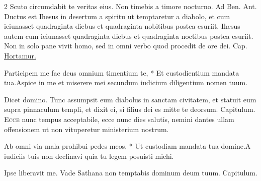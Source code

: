 \begin{multicols*}{2}
\newline \V Scuto circumdabit te veritas eius. \R Non timebis a timore nocturno. {\color{Red} Ad Ben. Ant.} Ductus est Ihesus in desertum a spiritu ut temptaretur a diabolo, et cum ieiunasset quadraginta diebus et quadraginta nobitibus postea esuriit.
 Ihesus autem cum ieiunasset quadraginta diebus et quadraginta noctibus postea esuriit.
 Non in solo pane vivit homo, sed in omni verbo quod procedit de ore dei. {\color{Red} Cap.} \hyperlink{hortamur-vos}{Hortamur.}
\begin{responsory-breve}[participem-me]
{Participem me fac deus omnium timentium te, * Et custodientium mandata tua.}{Aspice in me et miserere mei secundum iudicium diligentium nomen tuum.}
\end{responsory-breve}%
\V Dicet domino.
 Tunc assumpsit eum diabolus in sanctam civitatem, et statuit eum supra pinnaculum templi, et dixit ei, si filius dei es mitte te deorsum. {\color{Red} Capitulum.}
\lettrine[lines=2]{\zallmancaps \color{Blue} E}{cce} nunc tempus acceptabile, ecce nunc dies salutis, nemini dantes ullam offensionem ut non vituperetur ministerium nostrum.
\begin{responsory-breve}
{Ab omni via mala prohibui pedes meos, * Ut custodiam mandata tua domine.}{A iudiciis tuis non declinavi quia tu legem posuisti michi.}
\end{responsory-breve}%
\V Ipse liberavit me.
 Vade Sathana non temptabis dominum deum tuum. {\color{Red} Capitulum.}

\end{multicols*}
